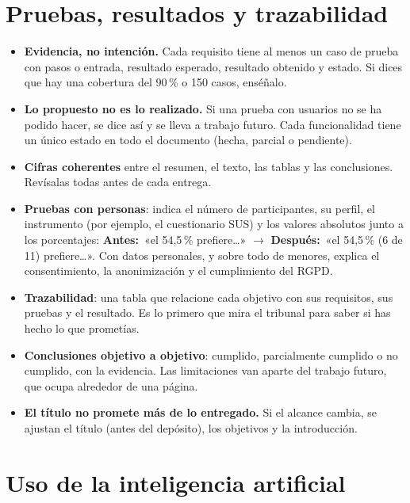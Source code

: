 \documentclass[11pt,a4paper]{article}
\newcommand{\antes}[1]{\textcolor{BrickRed!80!black}{\textbf{Antes:}}~«#1»}
\newcommand{\despues}[1]{\textcolor{ForestGreen!80!black}{\textbf{Después:}}~«#1»}
\begin{document}
\section{Pruebas, resultados y trazabilidad}
\label{sec:pruebas}

\begin{itemize}
  \item \textbf{Evidencia, no intención.} Cada requisito tiene al menos un caso
        de prueba con pasos o entrada, resultado esperado, resultado obtenido y
        estado. Si dices que hay una cobertura del 90\,\% o 150 casos, enséñalo.
  \item \textbf{Lo propuesto no es lo realizado.} Si una prueba con usuarios no
        se ha podido hacer, se dice así y se lleva a trabajo futuro. Cada
        funcionalidad tiene un único estado en todo el documento (hecha,
        parcial o pendiente).
  \item \textbf{Cifras coherentes} entre el resumen, el texto, las tablas y las
        conclusiones. Revísalas todas antes de cada entrega.
  \item \textbf{Pruebas con personas}: indica el número de participantes, su
        perfil, el instrumento (por ejemplo, el cuestionario SUS) y los valores
        absolutos junto a los porcentajes: \antes{el 54,5\,\% prefiere\ldots}
        $\rightarrow$ \despues{el 54,5\,\% (6 de 11) prefiere\ldots}. Con datos
        personales, y sobre todo de menores, explica el consentimiento, la
        anonimización y el cumplimiento del RGPD.
  \item \textbf{Trazabilidad}: una tabla que relacione cada objetivo con sus
        requisitos, sus pruebas y el resultado. Es lo primero que mira el
        tribunal para saber si has hecho lo que prometías.
  \item \textbf{Conclusiones objetivo a objetivo}: cumplido, parcialmente
        cumplido o no cumplido, con la evidencia. Las limitaciones van aparte
        del trabajo futuro, que ocupa alrededor de una página.
  \item \textbf{El título no promete más de lo entregado.} Si el alcance cambia,
        se ajustan el título (antes del depósito), los objetivos y la
        introducción.
\end{itemize}

\section{Uso de la inteligencia artificial}
\label{sec:ia}
\end{document}
